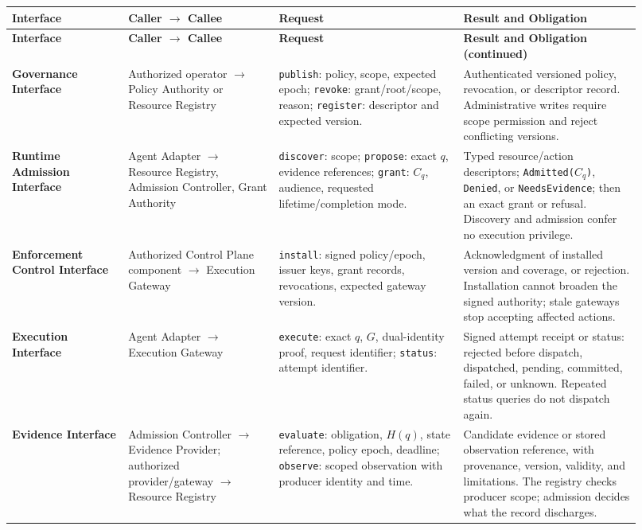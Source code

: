 \small
\begin{longtable}{L{0.17\linewidth}L{0.22\linewidth}L{0.27\linewidth}L{0.26\linewidth}}
\toprule
\textbf{Interface} & \textbf{Caller $\rightarrow$ Callee} & \textbf{Request} & \textbf{Result and Obligation}\\
\midrule
\endfirsthead
\toprule
\textbf{Interface} & \textbf{Caller $\rightarrow$ Callee} & \textbf{Request} & \textbf{Result and Obligation (continued)}\\
\midrule
\endhead
\textbf{Governance Interface} & Authorized operator $\rightarrow$ Policy Authority or Resource Registry & \texttt{publish}: policy, scope, expected epoch; \texttt{revoke}: grant/root/scope, reason; \texttt{register}: descriptor and expected version. & Authenticated versioned policy, revocation, or descriptor record. Administrative writes require scope permission and reject conflicting versions.\\
\textbf{Runtime Admission Interface} & Agent Adapter $\rightarrow$ Resource Registry, Admission Controller, Grant Authority & \texttt{discover}: scope; \texttt{propose}: exact $q$, evidence references; \texttt{grant}: $C_q$, audience, requested lifetime/completion mode. & Typed resource/action descriptors; \texttt{Admitted($C_q$)}, \texttt{Denied}, or \texttt{NeedsEvidence}; then an exact grant or refusal. Discovery and admission confer no execution privilege.\\
\textbf{Enforcement Control Interface} & Authorized Control Plane component $\rightarrow$ Execution Gateway & \texttt{install}: signed policy/epoch, issuer keys, grant records, revocations, expected gateway version. & Acknowledgment of installed version and coverage, or rejection. Installation cannot broaden the signed authority; stale gateways stop accepting affected actions.\\
\textbf{Execution Interface} & Agent Adapter $\rightarrow$ Execution Gateway & \texttt{execute}: exact $q$, $G$, dual-identity proof, request identifier; \texttt{status}: attempt identifier. & Signed attempt receipt or status: rejected before dispatch, dispatched, pending, committed, failed, or unknown. Repeated status queries do not dispatch again.\\
\textbf{Evidence Interface} & Admission Controller $\rightarrow$ Evidence Provider; authorized provider/gateway $\rightarrow$ Resource Registry & \texttt{evaluate}: obligation, $H(q)$, state reference, policy epoch, deadline; \texttt{observe}: scoped observation with producer identity and time. & Candidate evidence or stored observation reference, with provenance, version, validity, and limitations. The registry checks producer scope; admission decides what the record discharges.\\

\end{longtable}
